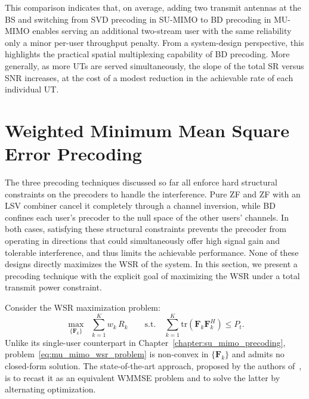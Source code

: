 This comparison indicates that, on average, adding two transmit antennas at the \ac{BS} and switching from \ac{SVD} precoding in \ac{SU}-\ac{MIMO} to \ac{BD} precoding in \ac{MU}-\ac{MIMO} enables serving an additional two-stream user with the same reliability only a minor per-user throughput penalty.
From a system-design perspective, this highlights the practical spatial multiplexing capability of \ac{BD} precoding.
More generally, as more \acp{UT} are served simultaneously, the slope of the total \ac{SR} versus \ac{SNR} increases, at the cost of a modest reduction in the achievable rate of each individual \ac{UT}.

\section{Weighted Minimum Mean Square Error Precoding}
\label{section:mu_mimo_wmmse_precoding}

The three precoding techniques discussed so far all enforce hard structural constraints on the precoders to handle the interference. Pure \ac{ZF} and \ac{ZF} with an \ac{LSV} combiner cancel it completely through a channel inversion, while \ac{BD} confines each user's precoder to the null space of the other users' channels.
In both cases, satisfying these structural constraints prevents the precoder from operating in directions that could simultaneously offer high signal gain and tolerable interference, and thus limits the achievable performance.
None of these designs directly maximizes the \acf{WSR} of the system.
In this section, we present a precoding technique with the explicit goal of maximizing the \ac{WSR} under a total transmit power constraint.

Consider the \ac{WSR} maximization problem:
\begin{equation}
\label{eq:mu_mimo_wsr_problem}
    \underset{\{\mathbf{F}_k\}}{\max} \;\; \sum_{k=1}^{K} w_k \, R_k \qquad \text{s.t.} \quad \sum_{k=1}^{K} \mathrm{tr}\!\left(\mathbf{F}_k \mathbf{F}_k^H\right) \leq P_t.
\end{equation}
Unlike its single-user counterpart in Chapter~\ref{chapter:su_mimo_precoding}, problem~\eqref{eq:mu_mimo_wsr_problem} is non-convex in $\{\mathbf{F}_k\}$ and admits no closed-form solution.
The state-of-the-art approach, proposed by the authors of~\cite{WMMSE_precoding}, is to recast it as an equivalent \ac{WMMSE} problem and to solve the latter by alternating optimization.
\medskip

